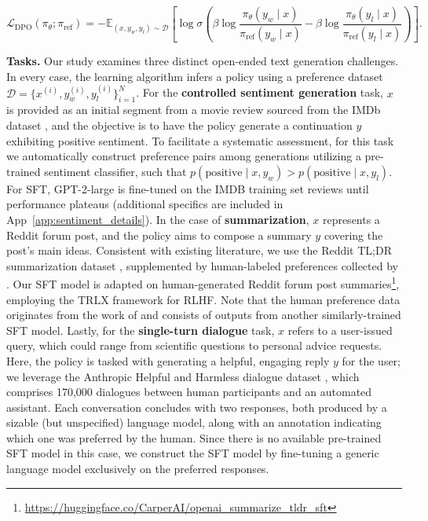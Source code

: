 \begin{equation}\label{eq:optimum_model}
    \mathcal{L}_\text{DPO}(\pi_{\theta}; \pi_\text{ref}) = -\mathbb{E}_{(x, y_w, y_l)\sim \mathcal{D}}\left[\log \sigma \left(\beta \log \frac{\pi_{\theta}(y_w\mid x)}{\pi_\text{ref}(y_w\mid x)} - \beta \log \frac{\pi_{\theta}(y_l\mid x)}{\pi_\text{ref}(y_l\mid x)}\right)\right].
\end{equation}

\textbf{Tasks.} Our study examines three distinct open-ended text generation challenges. In every case, the learning algorithm infers a policy using a preference dataset $\mathcal{D}=\bigl\{x^{(i)}, y_w^{(i)}, y_l^{(i)}\bigr\}_{i=1}^N$. For the \textbf{controlled sentiment generation} task, $x$ is provided as an initial segment from a movie review sourced from the IMDb dataset \cite{maas-EtAl:2011:ACL-HLT2011}, and the objective is to have the policy generate a continuation $y$ exhibiting positive sentiment. To facilitate a systematic assessment, for this task we automatically construct preference pairs among generations utilizing a pre-trained sentiment classifier, such that $p(\text{positive}\mid x,y_w)>p(\text{positive}\mid x,y_l)$. For SFT, GPT-2-large is fine-tuned on the IMDB training set reviews until performance plateaus (additional specifics are included in App~\ref{app:sentiment_details}). In the case of \textbf{summarization}, $x$ represents a Reddit forum post, and the policy aims to compose a summary $y$ covering the post’s main ideas. Consistent with existing literature, we use the Reddit TL;DR summarization dataset \citep{volske-etal-2017-tl}, supplemented by human-labeled preferences collected by \citeauthor{stiennon2022learning}. Our SFT model is adapted on human-generated Reddit forum post summaries\footnote{\url{https://huggingface.co/CarperAI/openai_summarize_tldr_sft}}, employing the TRLX framework \citep{leandro_von_werra_2023_7790115} for RLHF. Note that the human preference data originates from the work of \citeauthor{stiennon2022learning} and consists of outputs from another similarly-trained SFT model. Lastly, for the \textbf{single-turn dialogue} task, $x$ refers to a user-issued query, which could range from scientific questions to personal advice requests. Here, the policy is tasked with generating a helpful, engaging reply $y$ for the user; we leverage the Anthropic Helpful and Harmless dialogue dataset \citep{bai2022training}, which comprises 170,000 dialogues between human participants and an automated assistant. Each conversation concludes with two responses, both produced by a sizable (but unspecified) language model, along with an annotation indicating which one was preferred by the human. Since there is no available pre-trained SFT model in this case, we construct the SFT model by fine-tuning a generic language model exclusively on the preferred responses.

